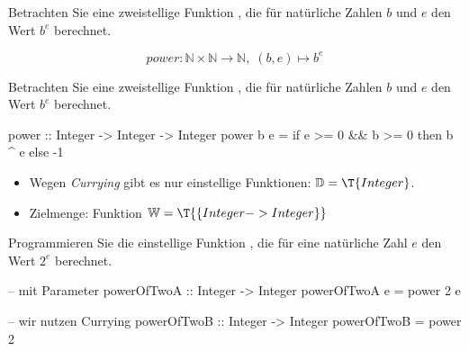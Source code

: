 \begin{frame}[fragile]
    \begin{exercise}
        Betrachten Sie eine zweistellige Funktion , die für natürliche Zahlen $b$ und $e$ den Wert $b^e$ berechnet.
    \end{exercise}
    \begin{solve}
        $$power:\mathbb{N}\times\mathbb{N}\to\mathbb{N},\;(b,e)\mapsto b^e$$
    \end{solve}
\end{frame}
\addtocounter{exercise}{-1}\addtocounter{solve}{-1}%
\begin{frame}[fragile]
    \begin{exercise}
        Betrachten Sie eine zweistellige Funktion , die für natürliche Zahlen $b$ und $e$ den Wert $b^e$ berechnet.
    \end{exercise}
    \begin{solve}
    \begin{plainhaskell}
power :: Integer -> Integer -> Integer
power b e =
    if e >= 0 && b >= 0
    then b ^ e
    else -1
    \end{plainhaskell}
    \begin{itemize}
        \item Wegen \textit{Currying} gibt es nur einstellige Funktionen: $\mathbb{D}=\T{Integer}$.
        \item Zielmenge: Funktion $\mathbb{W}=\T{\{Integer -> Integer\}}$
    \end{itemize}
    \end{solve}
\end{frame}
\addtocounter{exercise}{-1}\addtocounter{solve}{-1}%
\begin{frame}[fragile]
    \begin{exercise}
        Programmieren Sie die einstellige Funktion , die für eine natürliche Zahl $e$ den Wert $2^e$ berechnet.
    \end{exercise}
    \begin{solve}[c)]
    \begin{plainhaskell}
-- mit Parameter
powerOfTwoA :: Integer -> Integer
powerOfTwoA e = power 2 e

-- wir nutzen Currying
powerOfTwoB :: Integer -> Integer
powerOfTwoB = power 2
    \end{plainhaskell}
    \end{solve}
\end{frame}